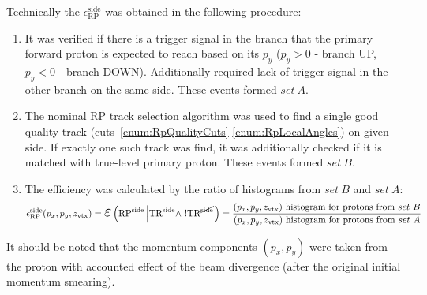 Technically the $\epsilon_{\text{RP}}^{\text{side}}$ was obtained in the following procedure:
\begin{enumerate}
	\item It was verified if there is a trigger signal in the branch that the primary forward proton is expected to reach based on its $p_{y}$ ($p_{y}>0$ - branch UP, $p_{y}<0$ - branch DOWN). Additionally required lack of trigger signal in the other branch on the same side. These events formed $set~A$.
	\item The nominal RP track selection algorithm was used to find a single good quality track (cuts~\ref{enum:RpQualityCuts}-\ref{enum:RpLocalAngles}) on given side. If exactly one such track was find, it was additionally checked if it is matched with true-level primary proton. These events formed $set~B$.
	\item The efficiency was calculated by the ratio of histograms from $set~B$ and $set~A$:
	\begin{equation}\label{eq:rpEffDef}
 \epsilon_{\text{RP}}^{\text{side}}(p_{x}, p_{y}, z_{\text{vtx}}) = \mbox{\LARGE$\varepsilon$}\left(\RPSIDE\left|\TRSIDE\land~!\TRNSIDE\right.\right) = %
 \frac{(p_{x}, p_{y}, z_{\text{vtx}})~\text{histogram for protons from}~set~B}{(p_{x}, p_{y}, z_{\text{vtx}})~\text{histogram for protons from}~set~A}
  \end{equation}
	
\end{enumerate}

It should be noted that the momentum components $(p_{x}, p_{y})$ were taken from the proton with accounted effect of the beam divergence (after the original initial momentum smearing).

